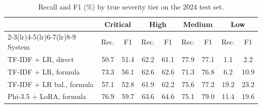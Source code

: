 \begin{table}[t]
\centering
\caption{Recall and F1 (\%) by true severity tier on the 2024 test set.}
\label{tab:tiers}
\small
\setlength{\tabcolsep}{3.5pt}
\begin{tabular}{lcccccccc}
\toprule
 & \multicolumn{2}{c}{Critical} & \multicolumn{2}{c}{High} & \multicolumn{2}{c}{Medium} & \multicolumn{2}{c}{Low} \\
\cmidrule(lr){2-3}\cmidrule(lr){4-5}\cmidrule(lr){6-7}\cmidrule(lr){8-9}
System & Rec. & F1 & Rec. & F1 & Rec. & F1 & Rec. & F1 \\
\midrule
TF-IDF + LR, direct & 50.7 & 51.4 & 62.2 & 61.1 & 77.9 & 77.1 & 1.1 & 2.2 \\
TF-IDF + LR, formula & 73.3 & 56.1 & 62.6 & 62.6 & 71.3 & 76.8 & 6.2 & 10.9 \\
TF-IDF + LR bal., formula & 57.1 & 52.8 & 61.9 & 62.2 & 75.6 & 77.2 & 19.2 & 23.2 \\
Phi-3.5 + LoRA, formula & 76.9 & 59.7 & 63.6 & 64.6 & 75.1 & 79.0 & 11.4 & 19.6 \\
\bottomrule
\end{tabular}
\end{table}
